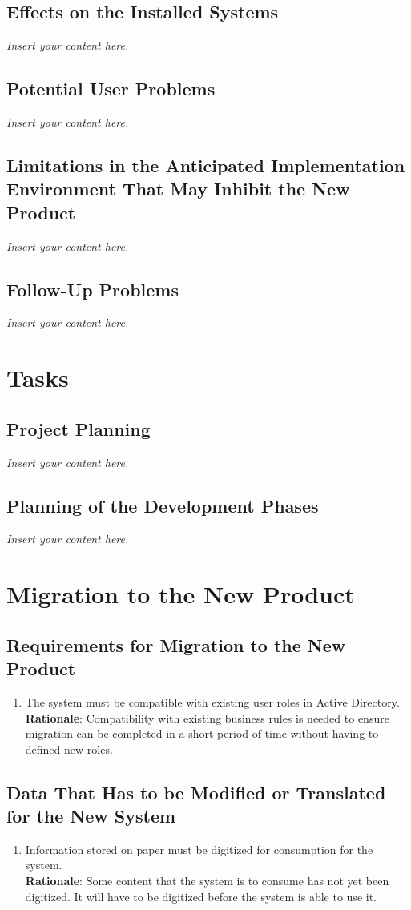 \documentclass[12pt]{article}
\newcommand{\lips}{\textit{Insert your content here.}}
\begin{document}
\subsection{Effects on the Installed Systems}
\lips
\subsection{Potential User Problems}
\lips
\subsection{Limitations in the Anticipated Implementation Environment That May
Inhibit the New Product}
\lips
\subsection{Follow-Up Problems}
\lips

\section{Tasks}
\subsection{Project Planning}
\lips
\subsection{Planning of the Development Phases}
\lips

\section{Migration to the New Product}
\subsection{Requirements for Migration to the New Product}
\begin{enumerate} [{MI-NP}1.]
  \item The system must be compatible with existing user roles in Active
    Directory.\\
    \textbf{Rationale}: Compatibility with existing business rules is needed
    to ensure migration can be completed in a short period of time without
    having to defined new roles.
\end{enumerate}

\subsection{Data That Has to be Modified or Translated for the New System}
\begin{enumerate} [{MI-TR}1.]
  \item Information stored on paper must be digitized for consumption for the
    system.\\
    \textbf{Rationale}: Some content that the system is to consume has not yet
    been digitized. It will have to be digitized before the system is able to
    use it.
\end{enumerate}
\end{document}
